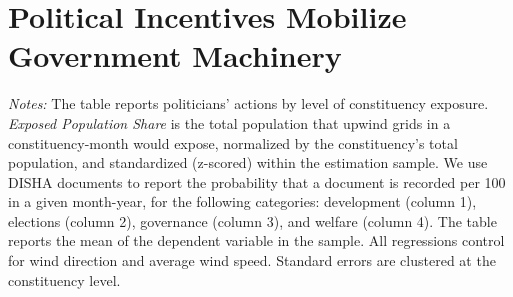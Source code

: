 \documentclass[12pt]{article}
\providecommand{\resultsuffix}{}
\let\SourceInput
\renewcommand{}[1]{%
  \IfFileExists{../../#1\resultsuffix.tex}{\SourceInput{../../#1\resultsuffix.tex}}{%
  \IfFileExists{../../#1}{\SourceInput{../../#1}}{%
    \IfFileExists{../../#1.tex}{\SourceInput{../../#1.tex}}{%
      \fbox{\scriptsize Missing table: \detokenize{#1}}}}}}
\begin{document}

\FloatBarrier
\section{Political Incentives Mobilize Government Machinery}
\begin{table}[htbp]
    \centering
    \caption{Pollution Exposure and Politicians' Actions, all categories}
    \label{tab:court_disha_app}
    \resizebox{\textwidth}{!}{
    
    }
    \begin{minipage}{\textwidth}
        {\small \textit{Notes:}  The table reports politicians' actions by level of constituency exposure. 
        \textit{Exposed Population Share}  is the total population that upwind grids in a constituency-month would expose, normalized by the constituency's total population, and standardized (z-scored) within the estimation sample.
        We use DISHA documents to report the probability that a document is recorded per 100 in a given month-year, for the following categories: development (column 1), elections (column 2), governance (column 3), and welfare (column 4).
        The table reports the mean of the dependent variable in the sample. All regressions control for wind direction and average wind speed. Standard errors are clustered at the constituency level.  }
    \end{minipage}
\end{table}

 
 
 
\end{document}
